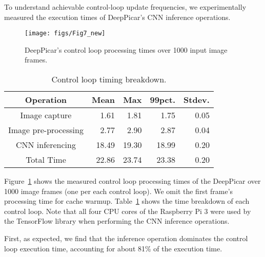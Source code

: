 To understand achievable control-loop update frequencies, we
experimentally measured the execution times of DeepPicar's CNN
inference operations.


\begin{figure}[h]
  \centering
  \texttt{[image: figs/Fig7\_new]}
  \caption{DeepPicar's control loop processing times over 1000 input image frames.}
  \label{fig:control-loop-timing}
\end{figure}

\begin{table}[h]
  \centering
  \begin{tabular} {| c | r | r | r | r |}
    \hline
    \textbf{Operation} & \textbf{Mean} & \textbf{Max} &   \textbf{99pct.} & \textbf{Stdev.} \\ \hline
    Image capture        & 1.61  &  1.81 &  1.75  & 0.05 \\ \hline
    Image pre-processing & 2.77  &  2.90 &  2.87  & 0.04 \\ \hline
    CNN inferencing      & 18.49 & 19.30 & 18.99  & 0.20 \\ \hline
    Total Time           & 22.86 & 23.74 & 23.38  & 0.20 \\ \hline
  \end{tabular}
  \caption{Control loop timing breakdown.}
  \label{tbl:control-loop-breakdown}
\end{table}

Figure~\ref{fig:control-loop-timing} shows the measured control loop 
processing times of the DeepPicar over 1000 image frames (one per each
control loop). We omit the first frame's processing time for cache
warmup. Table~\ref{tbl:control-loop-breakdown} shows the time
breakdown of each control loop. Note that all four CPU cores of the
Raspberry Pi 3 were used by the TensorFlow library when performing the
CNN inference operations.

First, as expected, we find that the inference operation
dominates the control loop execution time, accounting for about 81\% of
the execution time.

